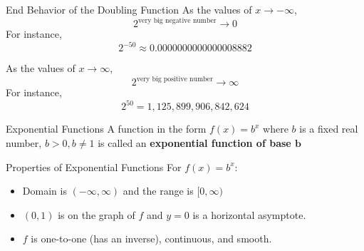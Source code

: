 \documentclass[t,usenames,dvipsnames]{beamer}
\begin{document}
\begin{frame}{End Behavior of the Doubling Function}
As the values of $x \to -\infty$, 
\[ 2^{\text{very big negative number}} \to 0 \] \pause
For instance,
\[ 2^{-50} \approx 0.0000000000000008882 \] \pause
\bigskip

As the values of $x \to \infty$,
\[ 2^{\text{very big positive number}} \to \infty \]    \pause
For instance,
\[ 2^{50} = 1,125,899,906,842,624\]
\end{frame}

\begin{frame}{Exponential Functions}
A function in the form $f(x) = b^x$ where $b$ is a fixed real number, $b > 0, b \neq 1$ is called an \textbf{exponential function of base $\bm{b}$}  \newline\\  \pause
\begin{minipage}{0.45\textwidth}
\end{minipage}
\hspace{0.5cm}
\begin{minipage}{0.45\textwidth}
\end{minipage}
\end{frame}

\begin{frame}{Properties of Exponential Functions}
For $f(x) = b^x$:   \newline\\
\begin{itemize}
    \item Domain is $(-\infty, \infty)$ and the range is $[0,\infty)$ \newline\\ \pause
    \item $(0,1)$ is on the graph of $f$ and $y=0$ is a horizontal asymptote. \newline\\ \pause
    \item $f$ is one-to-one (has an inverse), continuous, and smooth.
\end{itemize}
\end{frame}
\end{document}
